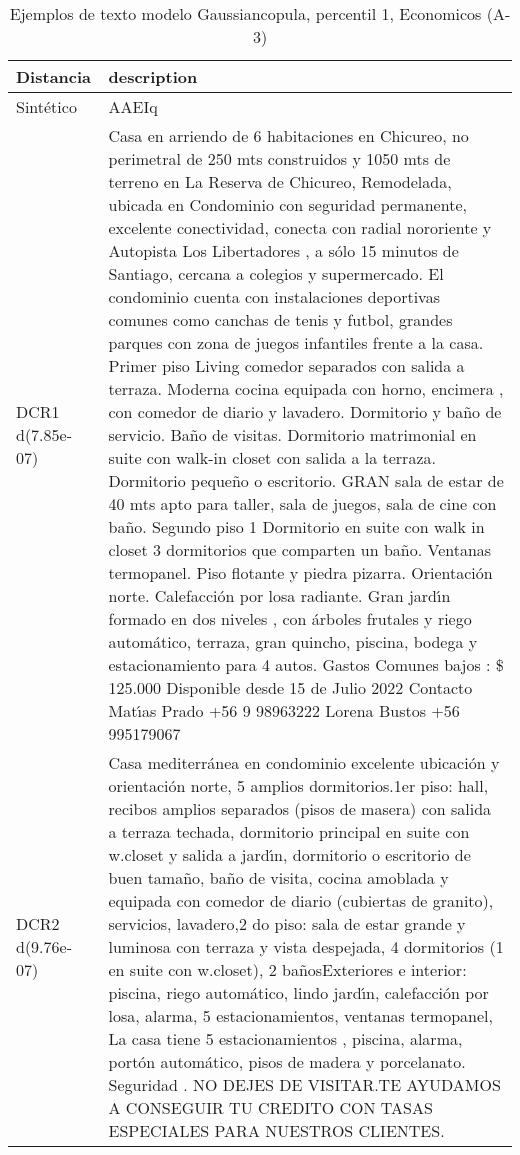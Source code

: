 \begin{table}[H]
\centering
\fontsize{10}{14}\selectfont
\caption{Ejemplos de texto modelo Gaussiancopula, percentil 1, Economicos (A-3)}
\label{table-example-economicos-a-3-gaussiancopula-1p-text}
\begin{tabular}{|l|m{35em}|}
\hline
\rowcolor[gray]{0.8}
Distancia & description \\
\hline Sintético & AAEIq \\
\hline DCR1 d(7.85e-07) & Casa en arriendo de 6 habitaciones en Chicureo, no perimetral de 250 mts construidos y 1050 mts de terreno en La Reserva de Chicureo, Remodelada, ubicada en Condominio con seguridad permanente, excelente conectividad, conecta con radial nororiente y Autopista Los Libertadores , a s\'olo 15 minutos de Santiago, cercana a colegios y supermercado. El condominio cuenta con instalaciones deportivas comunes como canchas de tenis y futbol, grandes parques con zona de juegos infantiles frente a la casa.
  Primer piso Living comedor separados con salida a terraza. Moderna cocina equipada con horno, encimera , con comedor de diario y lavadero. Dormitorio y ba\~no de servicio. Ba\~no de visitas. Dormitorio matrimonial en suite con walk-in closet con salida a la terraza. Dormitorio peque\~no o escritorio. GRAN sala de estar de 40 mts apto para taller, sala de juegos, sala de cine con ba\~no.  Segundo piso 1 Dormitorio en suite con walk  in closet 3 dormitorios que comparten un ba\~no.  Ventanas termopanel. Piso flotante y piedra pizarra. Orientaci\'on norte. Calefacci\'on por losa radiante. Gran jard{\'\i}n formado en dos niveles , con \'arboles frutales y riego autom\'atico, terraza, gran quincho, piscina, bodega y estacionamiento para 4 autos. Gastos Comunes bajos : \$ 125.000 Disponible desde 15 de Julio 2022 Contacto  Mat{\'\i}as Prado +56 9 98963222 Lorena Bustos +56 995179067 \\
\hline DCR2 d(9.76e-07) & Casa mediterr\'anea en condominio excelente ubicaci\'on y orientaci\'on norte, 5 amplios dormitorios.1er piso: hall, recibos amplios separados (pisos de masera) con salida a terraza techada, dormitorio principal en suite con w.closet y salida a jard{\'\i}n, dormitorio o escritorio de buen tama\~no, ba\~no de visita, cocina amoblada y equipada con comedor de diario (cubiertas de granito), servicios, lavadero,2 do piso: sala de estar grande y luminosa con terraza y vista despejada, 4 dormitorios (1 en suite con w.closet), 2 ba\~nosExteriores e interior: piscina, riego autom\'atico, lindo jard{\'\i}n, calefacci\'on por losa, alarma, 5 estacionamientos, ventanas termopanel, La casa tiene 5 estacionamientos , piscina, alarma, port\'on autom\'atico, pisos de madera y porcelanato. Seguridad . NO DEJES DE VISITAR.TE AYUDAMOS A CONSEGUIR TU CREDITO CON TASAS ESPECIALES PARA NUESTROS CLIENTES. \\
\hline
\end{tabular}
\end{table}
